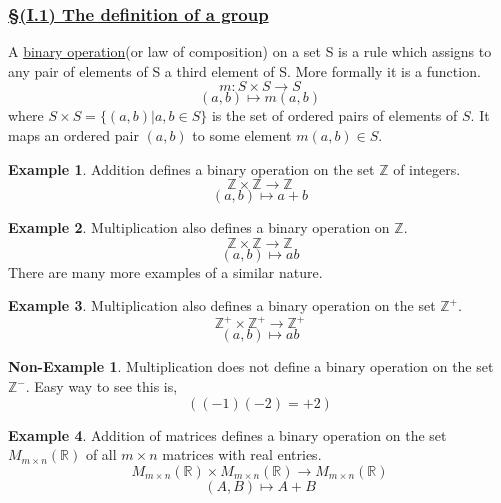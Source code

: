 \documentclass{article}
\theoremstyle{definition}
\newtheorem*{example}{Example}\theoremstyle{definition}
\newtheorem*{nonexample}{Non-Example}
\begin{document}
\subsubsection*{\underline{\S (I.1) The definition of a group}}
\begin{tcolorbox} [title= Definition:, colback=black!10!white]
    A \underline{binary operation}(or law of composition) on a set S is a rule which assigns to any pair of elements of S a third element of S. More formally it is a function.
    $$m:S\times S\to S$$
    $$(a,b)\mapsto m(a,b)$$
    where $S\times S=\{(a,b)|a,b\in S\}$ is the set of ordered pairs of elements of $S$. It maps an ordered pair $(a,b)$ to some element $m(a,b)\in S$.
\end{tcolorbox}


\begin{example}
    Addition defines a binary operation on the set $\mathbb{Z}$ of integers.
    $$\mathbb{Z}\times\mathbb{Z}\to\mathbb{Z}$$
    $$(a,b)\mapsto a+b$$
\end{example}

\begin{example}
    Multiplication also defines a binary operation on $\mathbb{Z}$.
    $$\mathbb{Z}\times\mathbb{Z}\to\mathbb{Z}$$
    $$(a,b)\mapsto ab$$
    There are many more examples of a similar nature.
\end{example}

\begin{example}
    Multiplication also defines a binary operation on the set $\mathbb{Z}^+$.
    $$\mathbb{Z}^+\times\mathbb{Z}^+\to\mathbb{Z}^+$$
    $$(a,b)\mapsto ab$$
\end{example}

\begin{nonexample}
    Multiplication does not define a binary operation on the set $\mathbb{Z}^-$. Easy way to see this is, 
    $$((-1)(-2)=+2)$$
\end{nonexample}

\begin{example}
    Addition of matrices defines a binary operation on the set $M_{m\times n}(\mathbb{R})$ of all $m\times n$ matrices with real entries.
    $$M_{m\times n}(\mathbb{R})\times M_{m\times n}(\mathbb{R})\to M_{m\times n}(\mathbb{R})$$
    $$(A,B)\mapsto A+B$$
\end{example}
\end{document}
